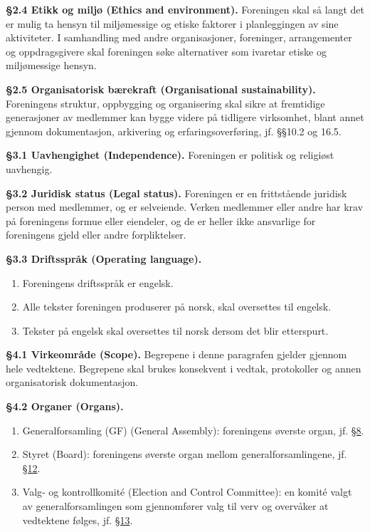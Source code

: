 \documentclass{../../../Common/Latex/Templates/rapport}
\begin{document}
\textbf{\S 2.4 Etikk og miljø (Ethics and environment).}\label{bylaw:2.4} Foreningen skal så langt det er mulig ta hensyn til miljømessige og etiske faktorer i planleggingen av sine aktiviteter. I samhandling med andre organisasjoner, foreninger, arrangementer og oppdragsgivere skal foreningen søke alternativer som ivaretar etiske og miljømessige hensyn.

\textbf{\S 2.5 Organisatorisk bærekraft (Organisational sustainability).}\label{bylaw:2.5} Foreningens struktur, oppbygging og organisering skal sikre at fremtidige generasjoner av medlemmer kan bygge videre på tidligere virksomhet, blant annet gjennom dokumentasjon, arkivering og erfaringsoverføring, jf. \S\S10.2 og 16.5.

\label{bylaw:3}
\textbf{\S 3.1 Uavhengighet (Independence).}\label{bylaw:3.1} Foreningen er politisk og religiøst uavhengig.

\textbf{\S 3.2 Juridisk status (Legal status).}\label{bylaw:3.2} Foreningen er en frittstående juridisk person med medlemmer, og er selveiende. Verken medlemmer eller andre har krav på foreningens formue eller eiendeler, og de er heller ikke ansvarlige for foreningens gjeld eller andre forpliktelser.

\textbf{\S 3.3 Driftsspråk (Operating language).}\label{bylaw:3.3}
\begin{enumerate}
  \item Foreningens driftsspråk er engelsk.
  \item Alle tekster foreningen produserer på norsk, skal oversettes til engelsk.
  \item Tekster på engelsk skal oversettes til norsk dersom det blir etterspurt.
\end{enumerate}

\label{bylaw:4}
\textbf{\S 4.1 Virkeområde (Scope).}\label{bylaw:4.1} Begrepene i denne paragrafen gjelder gjennom hele vedtektene. Begrepene skal brukes konsekvent i vedtak, protokoller og annen organisatorisk dokumentasjon.

\textbf{\S 4.2 Organer (Organs).}\label{bylaw:4.2}
\begin{enumerate}
  \item Generalforsamling (GF) (General Assembly): foreningens øverste organ, jf. \hyperref[bylaw:8]{\S 8}.
  \item Styret (Board): foreningens øverste organ mellom generalforsamlingene, jf. \hyperref[bylaw:12]{\S 12}.
  \item Valg- og kontrollkomité (Election and Control Committee): en komité valgt av generalforsamlingen som gjennomfører valg til verv og overvåker at vedtektene følges, jf. \hyperref[bylaw:13]{\S 13}.
\end{enumerate}
\end{document}
